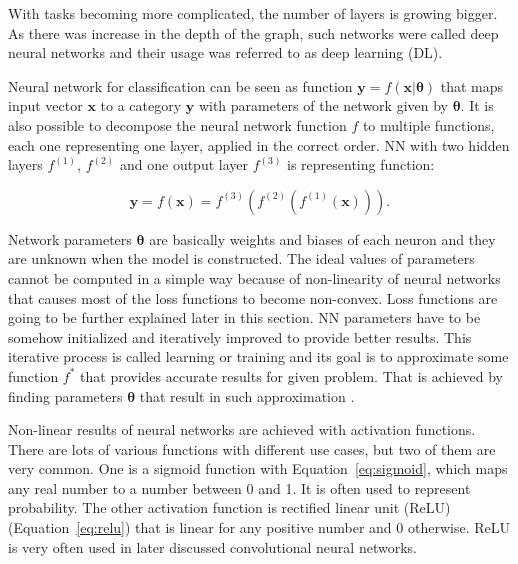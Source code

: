 
With tasks becoming more complicated, the number of layers is growing bigger. As there was increase in the depth of the graph, such networks were called deep neural networks and their usage was referred to as deep learning (DL).

Neural network for classification can be seen as function $\pmb y=f(\pmb x | \pmb \theta)$ that maps input vector $\pmb x$ to a category $\pmb y$ with parameters of the network given by $\pmb \theta$. It is also possible to decompose the neural network function $f$ to multiple functions, each one representing one layer, applied in the correct order. NN with two hidden layers $f^{(1)}$, $f^{(2)}$ and one output layer $f^{(3)}$ is representing function:

\begin{equation}
    \label{eq:forward-prop}
    \pmb y = f(\pmb x) = f^{(3)}(f^{(2)}(f^{(1)}(\pmb x))).
\end{equation}

Network parameters $\pmb \theta$ are basically weights and biases of each neuron and they are unknown when the model is constructed. The ideal values of parameters cannot be computed in a simple way because of non-linearity of neural networks that causes most of the loss functions to become non-convex. Loss functions are going to be further explained later in this section. NN parameters have to be somehow initialized and iteratively improved to provide better results. This iterative process is called learning or training and its goal is to approximate some function $f^*$ that provides accurate results for given problem. That is achieved by finding parameters $\pmb \theta$ that result in such approximation \cite{Goodfellow-et-al-2016}.

Non-linear results of neural networks are achieved with activation functions. There are lots of various functions with different use cases, but two of them are very common. One is a sigmoid function with Equation~\ref{eq:sigmoid}, which maps any real number to a number between 0 and 1. It is often used to represent probability. The other activation function is rectified linear unit (ReLU) (Equation~\ref{eq:relu}) that is linear for any positive number and 0 otherwise. ReLU is very often used in later discussed convolutional neural networks.

